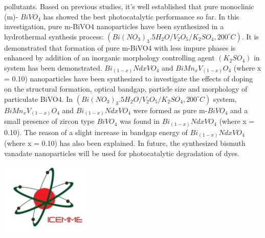 \documentclass[a4paper,20pt]{article}
\begin{document}
    \begin{minipage}{.68\linewidth} \begin{flushleft}
    
    		pollutants. Based on previous studies, it’s well established that pure monoclinic (m)- $BiVO_4$ has showed the best photocatalytic performance so far. In this investigation, pure m-BiVO4 nanoparticles have been synthesized in a hydrothermal synthesis process: $(Bi(NO_{3})_{3}.5H_{2}O/V_{2}O_{5}/K_{2}SO_{4}, 200 ^{\circ} C)$. It is demonstrated that formation of pure m-BiVO4 with less impure phases is enhanced by addition of an inorganic morphology controlling agent $(K_{2}SO_{4})$ in system has been demonstrated. $Bi_{(1-x)}Nd{x}VO_{4}$ and $BiMn_{x}V_{(1-x)}O_{4}$ (where x = 0.10) nanoparticles have been synthesized to investigate the effects of doping on the structural formation, optical bandgap, particle size and morphology of particulate BiVO4. In $(Bi(NO_{3})_{3}.5H_{2}O/V_{2}O_{5}/K_{2}SO_{4}, 200 ^{\circ} C)$ system, $BiMn_{x}V_{(1-x)}O_{4}$ and $Bi_{(1-x)}Nd{x}VO_{4}$ were formed as pure m-$BiVO_4$ and a small presence of zircon type $BiVO_4$ was found in $Bi_{(1-x)}Nd{x}VO_{4}$ (where x = 0.10). The reason of a slight increase in bandgap energy of $Bi_{(1-x)}Nd{x}VO_{4}$ (where x = 0.10) has also been explained. In future, the synthesized bismuth vanadate nanoparticles will be used for photocatalytic degradation of dyes.
    	\end{flushleft} \end{minipage}
    	\hfill 
    \begin{minipage}{0.29\linewidth}\begin{flushright}
    	 	\includegraphics[width=1.0\linewidth]{icemme}\\
    	\end{flushright}\end{minipage}
\end{document}
